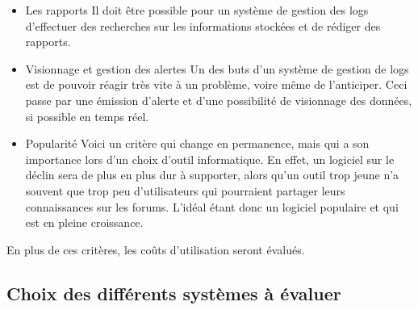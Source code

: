 \documentclass[paper=a4, fontsize=11pt]{scrartcl}
\begin{document}
\begin{itemize}
\item Les rapports
\subitem Il doit être possible pour un système de gestion des logs d'effectuer des recherches sur les informations stockées et de rédiger des rapports.\\
\item Visionnage et gestion des alertes
\subitem Un des buts d'un système de gestion de logs est de pouvoir réagir très vite à un problème, voire même de l'anticiper. Ceci passe par une émission d'alerte et d'une possibilité de visionnage des données, si possible en temps réel.\\
\item Popularité
\subitem Voici un critère qui change en permanence, mais qui a son importance lors d'un choix d'outil informatique. En effet, un logiciel sur le déclin sera de plus en plus dur à supporter, alors qu'un outil trop jeune n'a souvent que trop peu d'utilisateurs qui pourraient partager leurs connaissances sur les forums. L'idéal étant donc un logiciel populaire et qui est en pleine croissance.
\end{itemize}

En plus de ces critères, les coûts d'utilisation seront évalués.\\

\subsection{Choix des différents systèmes à évaluer}
\end{document}
